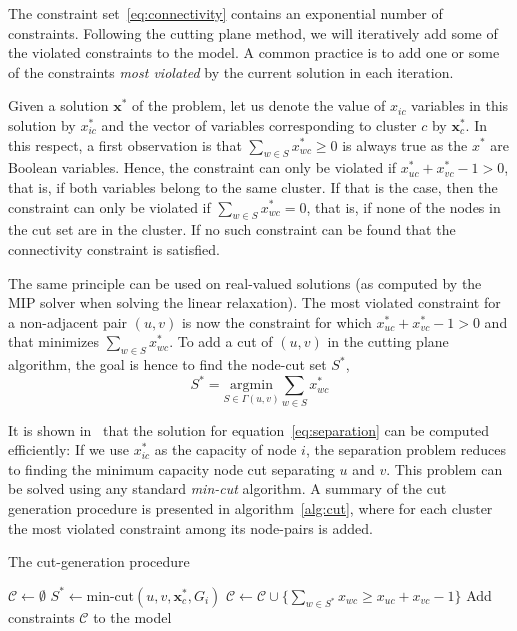 \documentclass[conference]{IEEEtran}
\begin{document}
The constraint set~\eqref{eq:connectivity} contains an exponential number of constraints. Following the cutting plane method, we will iteratively add some of the violated constraints to the model. A common practice is to add one or some of the constraints \emph{most violated} by the current solution in each iteration.

Given a solution $\mathbf{x}^*$ of the problem, let us denote the value of $x_{ic}$ variables in this solution by $x^*_{ic}$ and the vector of variables corresponding to cluster $c$ by $\mathbf{x}^*_c$.
In this respect, a first observation is that $\sum_{w \in S} x^*_{wc} \geq 0$ is always true as the $x^*$ are Boolean variables. Hence, the constraint can only be violated if $x^*_{uc} + x^*_{vc} - 1 > 0$, that is, if both variables belong to the same cluster. If that is the case, then the constraint can only be violated if $\sum_{w \in S} x^*_{wc} = 0$, that is, if none of the nodes in the cut set are in the cluster. If no such constraint can be found that the connectivity constraint is satisfied.

The same principle can be used on real-valued solutions (as computed by the MIP solver when solving the linear relaxation). The most violated constraint for a non-adjacent pair $(u,v)$ is now the constraint for which $x^*_{uc} + x^*_{vc} - 1 > 0$ and that minimizes $\sum_{w \in S} x^*_{wc}$. To add a cut of $(u,v)$ in the cutting plane algorithm, the goal is hence to find the node-cut set $S^*$,
\begin{equation}
S^* =\underset{S \in \Gamma(u, v)}{\mathrm{argmin}} \sum_{w \in S} x^*_{wc}
\label{eq:separation}
\end{equation}

It is shown in~\cite{CarvajalCGVW13} that the solution for equation~\ref{eq:separation} can be computed efficiently: If we use $x^*_{ic}$ as the capacity of node $i$, the separation problem reduces to finding the minimum capacity node cut separating $u$ and $v$. This problem can be solved using any standard \emph{min-cut} algorithm. A summary of the cut generation procedure is presented in algorithm~\ref{alg:cut}, where for each cluster the most violated constraint among its node-pairs is added.

\begin{algorithm}
\centering
\caption{The cut-generation procedure}
\label{alg:cut}
\begin{algorithmic}[1]
\State $\mathcal{C} \gets \emptyset$ 
		\State $S^* \gets \text{min-cut}(u, v, {\mathbf{x}}^{*}_c, G_i)$
		\State $\mathcal{C} \gets \mathcal{C} \cup \{\sum_{w \in S^*} x_{wc} \geq x_{uc} + x_{vc} - 1\}$
	\EndFor
\EndFor
\State Add constraints $\mathcal{C}$ to the model
\end{algorithmic}
\end{algorithm}
\end{document}
